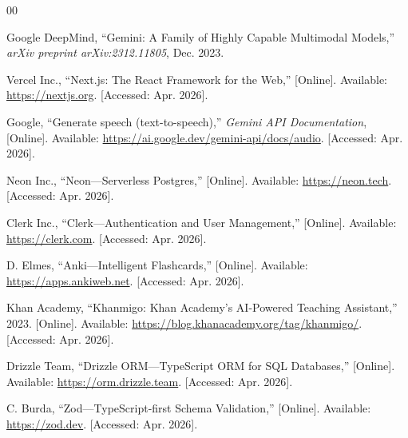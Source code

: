 \documentclass[conference]{IEEEtran}
\begin{document}
\begin{thebibliography}{00}

Google DeepMind, ``Gemini: A Family of Highly Capable Multimodal Models,'' \textit{arXiv preprint arXiv:2312.11805}, Dec. 2023.

Vercel Inc., ``Next.js: The React Framework for the Web,'' [Online]. Available: \url{https://nextjs.org}. [Accessed: Apr. 2026].

Google, ``Generate speech (text-to-speech),'' \textit{Gemini API Documentation}, [Online]. Available: \url{https://ai.google.dev/gemini-api/docs/audio}. [Accessed: Apr. 2026].

Neon Inc., ``Neon---Serverless Postgres,'' [Online]. Available: \url{https://neon.tech}. [Accessed: Apr. 2026].

Clerk Inc., ``Clerk---Authentication and User Management,'' [Online]. Available: \url{https://clerk.com}. [Accessed: Apr. 2026].

D. Elmes, ``Anki---Intelligent Flashcards,'' [Online]. Available: \url{https://apps.ankiweb.net}. [Accessed: Apr. 2026].

Khan Academy, ``Khanmigo: Khan Academy's AI-Powered Teaching Assistant,'' 2023. [Online]. Available: \url{https://blog.khanacademy.org/tag/khanmigo/}. [Accessed: Apr. 2026].

Drizzle Team, ``Drizzle ORM---TypeScript ORM for SQL Databases,'' [Online]. Available: \url{https://orm.drizzle.team}. [Accessed: Apr. 2026].

C. Burda, ``Zod---TypeScript-first Schema Validation,'' [Online]. Available: \url{https://zod.dev}. [Accessed: Apr. 2026].

\end{thebibliography}
\end{document}
